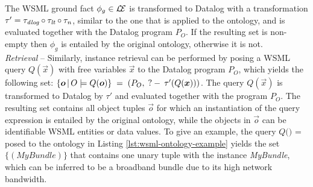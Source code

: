 The WSML ground fact $\phi_g \in \mathcal{L\!E}$ is transformed to Datalog
with a transformation $\tau' = \tau_{\textit{\scriptsize{dlog}}} \circ \tau_{\textit{\scriptsize{lt}}} \circ
\tau_{\textit{\scriptsize{n}}}$, similar to the one that is applied to the ontology,
and is evaluated together with the Datalog program $P_O$. If the
resulting set is non-empty then $\phi_g$ is entailed by the
original ontology, otherwise it is not.\\[2mm]
%
{\it Retrieval} -- Similarly, instance retrieval can be performed by
posing a WSML query $Q(\vec{x})$ with free variables $\vec{x}$ to
the Datalog program $P_O$, which yields the following set:
$\{\vec{o}  \, | \,  O \models Q(\vec{o})\} \; = \; (P_O, \qury
\tau'(Q(\vec{x})))$.
The query $Q(\vec{x})$ is transformed to Datalog by $\tau'$ and
evaluated together with the program $P_O$. The resulting set
contains all object tuples $\vec{o}$ for which an instantiation of
the query expression is entailed by the original ontology, while
the objects in $\vec{o}$ can be identifiable WSML entities or data
values. To give an
example, the query \thinspace $Q($$)$ = %
  
\thinspace posed to the ontology in Listing
\ref{lst:wsml-ontology-example} yields the set $\{
(\textit{MyBundle}) \}$ that contains one unary tuple with the
instance \textit{MyBundle}, which can be inferred to be a
broadband bundle due to its high network bandwidth.
